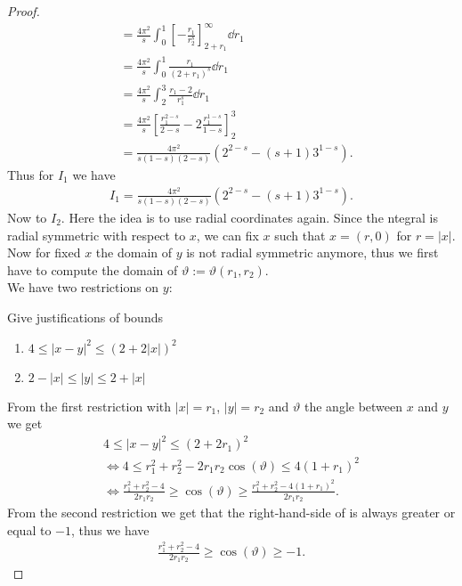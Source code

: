\begin{proof}
\begin{align}
		 & = \frac{4\pi^2}{s} \int_0^1 \left[ -\frac{r_1}{r_2^s} \right]_{2+r_1}^\infty \dd{r_1} \\
		 & = \frac{4\pi^2}{s} \int_0^1 \frac{r_1}{(2+r_1)^s} \dd{r_1} \\
		 & = \frac{4\pi^2}{s} \int_2^3 \frac{r_1 -2}{r_1^s} \dd{r_1} \\
		 & = \frac{4\pi^2}{s} \left[ \frac{r_1^{2-s}}{2-s} - 2 \frac{r_1^{1-s}}{1-s} \right]_2^3 \\
		 & = \frac{4\pi^2}{s(1-s)(2-s)} \left( 2^{2-s} -(s+1) 3^{1-s} \right).
	\end{align}
	Thus for \( I_1 \) we have
	\begin{gather}
		I_1 = \frac{4\pi^2}{s(1-s)(2-s)} \left( 2^{2-s} -(s+1) 3^{1-s} \right). \label{eq:203}
	\end{gather}
	Now to \( I_2 \). Here the idea is to use radial coordinates again. Since the ntegral
	is radial symmetric with respect to \( x \), we can fix \( x \) such that \( x = (r,
	0) \) for \( r = \lvert x\rvert \). Now for fixed \( x \) the domain of \( y \) is not
	radial symmetric anymore, thus we first have to compute the domain of \( \vartheta:=
	\vartheta (r_1, r_2) \). \\
	We have two restrictions on \( y \):
	\begin{TODO}
		Give justifications of bounds
	\end{TODO}
	\begin{enumerate}[label = (\arabic*)]
		\item \( 4 \leq \lvert x-y\rvert^2 \leq (2+2\lvert x\rvert)^2 \)
		\item \( 2-\lvert x\rvert \leq \lvert y\rvert \leq 2+\lvert x\rvert \)
	\end{enumerate}
	From the first restriction with \( \lvert x\rvert = r_1 \), \( \lvert y\rvert = r_2 \)
	and \( \vartheta \) the angle between \( x \) and \( y \) we get
	\begin{gather}
		4 \leq \lvert x-y\rvert^2 \leq (2+2r_1)^2 \\
		\Leftrightarrow 4 \leq r_1^2 + r_2^2 - 2r_1 r_2 \cos(\vartheta) \leq 4(1+r_1)^2 \\
		\Leftrightarrow \frac{r_1^2+r_2^2-4}{2r_1 r_2} \geq \cos(\vartheta) \geq \frac{r_1^2+r_2^2-4(1+r_1)^2}{2r_1 r_2}. \label{eq:204}
	\end{gather}
	From the second restriction we get that the right-hand-side of  is always
	greater or equal to \( -1 \), thus we have
	\begin{gather}
		\frac{r_1^2+r_2^2-4}{2r_1 r_2} \geq \cos(\vartheta) \geq -1.

\end{gather}
\end{proof}

